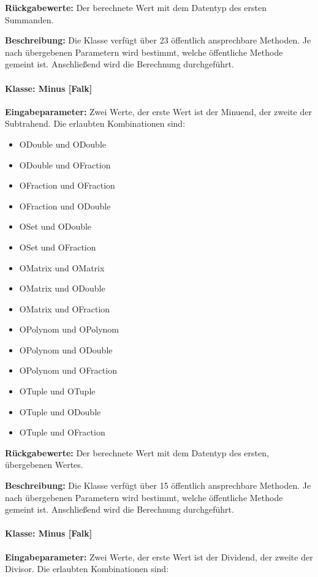 \textbf{Rückgabewerte: }Der berechnete Wert mit dem Datentyp des ersten Summanden. 

\textbf{Beschreibung: }Die Klasse verfügt über 23 öffentlich ansprechbare Methoden. Je nach übergebenen Parametern wird bestimmt, welche öffentliche Methode gemeint ist. Anschließend wird die Berechnung durchgeführt. 

\paragraph{Klasse: Minus [Falk]}

\textbf{Eingabeparameter: }Zwei Werte, der erste Wert ist der Minuend, der zweite der Subtrahend. Die erlaubten Kombinationen sind: 

\begin{itemize}
	\item ODouble und ODouble 
	\item ODouble und OFraction
	\item OFraction und OFraction 
	\item OFraction und ODouble 
	\item OSet und ODouble
	\item OSet und OFraction 
	\item OMatrix und OMatrix
	\item OMatrix und ODouble
	\item OMatrix und OFraction
	\item OPolynom und OPolynom 
	\item OPolynom und ODouble
	\item OPolynom und OFraction 
	\item OTuple und OTuple
	\item OTuple und ODouble
	\item OTuple und OFraction
\end{itemize} 

\textbf{Rückgabewerte: }Der berechnete Wert mit dem Datentyp des ersten, übergebenen Wertes. 

\textbf{Beschreibung: }Die Klasse verfügt über 15 öffentlich ansprechbare Methoden. Je nach übergebenen Parametern wird bestimmt, welche öffentliche Methode gemeint ist. Anschließend wird die Berechnung durchgeführt. 

\paragraph{Klasse: Minus [Falk]}

\textbf{Eingabeparameter: }Zwei Werte, der erste Wert ist der Dividend, der zweite der Divisor. Die erlaubten Kombinationen sind: 

